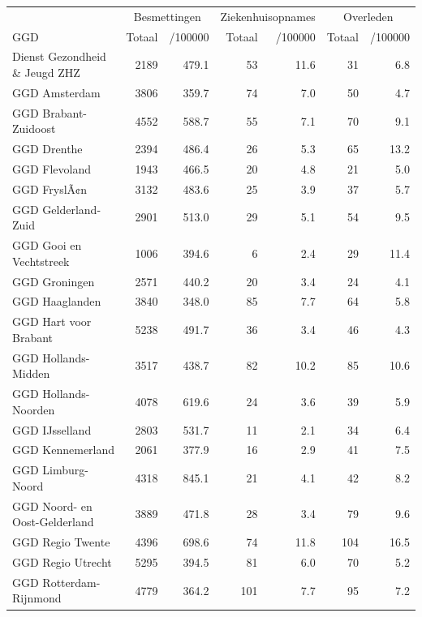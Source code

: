 \documentclass[
  english,
  man,floatsintext]{apa6}
\begin{document}
\begin{table}[H]
\centering\begingroup\fontsize{10}{12}\selectfont

\begin{threeparttable}
\begin{tabular}{lrrrrrr}
\toprule
\multicolumn{1}{c}{ } & \multicolumn{2}{c}{Besmettingen} & \multicolumn{2}{c}{Ziekenhuisopnames} & \multicolumn{2}{c}{Overleden} \\
\cmidrule(l{3pt}r{3pt}){2-3} \cmidrule(l{3pt}r{3pt}){4-5} \cmidrule(l{3pt}r{3pt}){6-7}
GGD & Totaal & /100000 & Totaal & /100000 & Totaal & /100000\\
\midrule
Dienst Gezondheid \& Jeugd ZHZ & 2189 & 479.1 & 53 & 11.6 & 31 & 6.8\\
GGD Amsterdam & 3806 & 359.7 & 74 & 7.0 & 50 & 4.7\\
GGD Brabant-Zuidoost & 4552 & 588.7 & 55 & 7.1 & 70 & 9.1\\
GGD Drenthe & 2394 & 486.4 & 26 & 5.3 & 65 & 13.2\\
GGD Flevoland & 1943 & 466.5 & 20 & 4.8 & 21 & 5.0\\
GGD FryslÃ¢n & 3132 & 483.6 & 25 & 3.9 & 37 & 5.7\\
GGD Gelderland-Zuid & 2901 & 513.0 & 29 & 5.1 & 54 & 9.5\\
GGD Gooi en Vechtstreek & 1006 & 394.6 & 6 & 2.4 & 29 & 11.4\\
GGD Groningen & 2571 & 440.2 & 20 & 3.4 & 24 & 4.1\\
GGD Haaglanden & 3840 & 348.0 & 85 & 7.7 & 64 & 5.8\\
GGD Hart voor Brabant & 5238 & 491.7 & 36 & 3.4 & 46 & 4.3\\
GGD Hollands-Midden & 3517 & 438.7 & 82 & 10.2 & 85 & 10.6\\
GGD Hollands-Noorden & 4078 & 619.6 & 24 & 3.6 & 39 & 5.9\\
GGD IJsselland & 2803 & 531.7 & 11 & 2.1 & 34 & 6.4\\
GGD Kennemerland & 2061 & 377.9 & 16 & 2.9 & 41 & 7.5\\
GGD Limburg-Noord & 4318 & 845.1 & 21 & 4.1 & 42 & 8.2\\
GGD Noord- en Oost-Gelderland & 3889 & 471.8 & 28 & 3.4 & 79 & 9.6\\
GGD Regio Twente & 4396 & 698.6 & 74 & 11.8 & 104 & 16.5\\
GGD Regio Utrecht & 5295 & 394.5 & 81 & 6.0 & 70 & 5.2\\
GGD Rotterdam-Rijnmond & 4779 & 364.2 & 101 & 7.7 & 95 & 7.2\\

\end{tabular}
\end{threeparttable}
\end{table}
\end{document}
